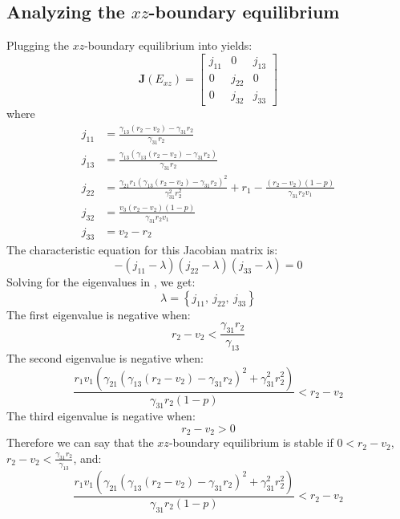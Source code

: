 \subsection{Analyzing the $xz$-boundary equilibrium}\label{subsec:stability_xz_boundary_equilibrium}
Plugging the $xz$-boundary equilibrium into  yields:
\begin{equation}
    \textbf{J}\left(E_{xz}\right)=\begin{bmatrix}
        j_{11} & 0 & j_{13}\\
        0 & j_{22} & 0\\
        0 & j_{32} & j_{33}
    \end{bmatrix}
    \label{eq:5.12}
\end{equation}
where
\begin{align*}
    j_{11} &= \frac{\gamma_{13}\left(r_2-v_2\right)-\gamma_{31}r_2}{\gamma_{31}r_2}\\
    j_{13} &= \frac{\gamma_{13}\left(\gamma_{13}\left(r_2-v_2\right)-\gamma_{31}r_2\right)}{\gamma_{31}r_2}\\
    j_{22} &= \frac{\gamma_{21}r_1\left(\gamma_{13}\left(r_2-v_2\right)-\gamma_{31}r_2\right)^2}{\gamma_{31}^2r_2^2}+r_1-\frac{\left(r_2-v_2\right)\left(1-p\right)}{\gamma_{31}r_2v_1}\\
    j_{32} &= \frac{v_3\left(r_2-v_2\right)\left(1-p\right)}{\gamma_{31}r_2v_1}\\
    j_{33} &= v_2-r_2
\end{align*}
The characteristic equation for this Jacobian matrix is:
\begin{equation}
    -\left(j_{11}-\lambda\right)\left(j_{22}-\lambda\right)\left(j_{33}-\lambda\right)=0
    \label{eq:5.13}
\end{equation}
Solving for the eigenvalues in , we get:
\[
\lambda=\left\{
j_{11},\ 
j_{22},\ 
j_{33}
\right\}
\]
The first eigenvalue is negative when:
\[
r_2-v_2<\frac{\gamma_{31}r_2}{\gamma_{13}}
\]
The second eigenvalue is negative when:
\[
\frac{r_1v_1\left(\gamma_{21}\left(\gamma_{13}\left(r_2-v_2\right)-\gamma_{31}r_2\right)^2+\gamma_{31}^2r_2^2\right)}{\gamma_{31}r_2\left(1-p\right)}<r_2-v_2
\]
The third eigenvalue is negative when:
\[
r_2-v_2>0
\]
Therefore we can say that the $xz$-boundary equilibrium is stable if $0<r_2-v_2$, $\displaystyle r_2-v_2<\frac{\gamma_{31}r_2}{\gamma_{13}}$, and:
\[
\frac{r_1v_1\left(\gamma_{21}\left(\gamma_{13}\left(r_2-v_2\right)-\gamma_{31}r_2\right)^2+\gamma_{31}^2r_2^2\right)}{\gamma_{31}r_2\left(1-p\right)}<r_2-v_2
\]

